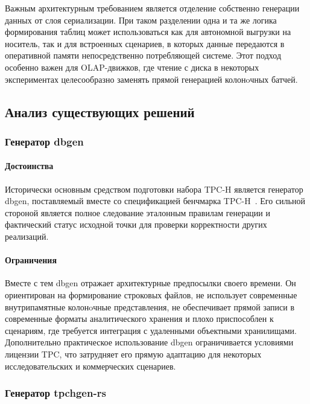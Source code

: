 Важным архитектурным требованием является отделение собственно генерации данных
от слоя сериализации. При таком разделении одна и та же логика формирования
таблиц может использоваться как для автономной выгрузки на носитель, так и для
встроенных сценариев, в которых данные передаются в оперативной памяти
непосредственно потребляющей системе. Этот подход особенно важен для
OLAP-движков, где чтение с диска в некоторых экспериментах целесообразно
заменять прямой генерацией колонoчных батчей.

\subsection{Анализ существующих решений}

\subsubsection{Генератор dbgen}

\paragraph{Достоинства}

Исторически основным средством подготовки набора TPC-H является генератор
dbgen, поставляемый вместе со спецификацией бенчмарка
TPC-H~\cite{tpch-spec,dbgen-mirror}. Его сильной стороной является полное
следование эталонным правилам генерации и фактический статус исходной точки для
проверки корректности других реализаций.

\paragraph{Ограничения}

Вместе с тем dbgen отражает архитектурные предпосылки своего времени.
Он ориентирован на формирование строковых файлов, не использует современные
внутрипамятные колонoчные представления, не обеспечивает прямой записи в
современные форматы аналитического хранения и плохо приспособлен к сценариям,
где требуется интеграция с удаленными объектными хранилищами. Дополнительно
практическое использование dbgen ограничивается условиями лицензии TPC,
что затрудняет его прямую адаптацию для некоторых исследовательских и
коммерческих сценариев.

\subsubsection{Генератор tpchgen-rs}

